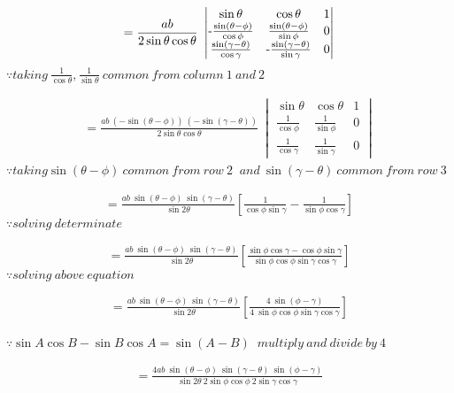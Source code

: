 \documentclass[journal,12pt,twocolumn]{IEEEtran}
\begin{document}
\begin{multline}
=\frac{ab}{2 \sin\theta\cos\theta}~\mydet{
 {\sin\theta} & {\cos\theta} & 1  \\ $-$
 \frac{\sin(\theta-\phi)}{\cos\phi} & \frac{\sin(\theta-\phi)}{\sin\phi} & 0  \\
 \frac{\sin(\gamma-\theta)}{\cos\gamma} &$-$ \frac{\sin(\gamma-\theta)}{\sin\gamma} & 0 
}
\end{multline}
$\because taking ~ \frac{1}{\cos\theta},\frac{1}{\sin\theta}~common ~from ~column~ 1 ~and~ 2$


\begin{multline}
=\frac{ab~(-\sin(\theta-\phi))~(-\sin(\gamma-\theta))}{2 \sin\theta\cos\theta}~\begin{vmatrix}
 {\sin\theta} & {\cos\theta} & 1  \\ 
 \frac{1}{\cos\phi} & \frac{1}{\sin\phi} & 0  \\
 \frac{1}{\cos\gamma} & \frac{1}{\sin\gamma} & 0 
\end{vmatrix}    
\end{multline}
$\because taking \sin(\theta-\phi)~common ~from ~row ~2$
$~and~\sin(\gamma-\theta)~common ~from ~row ~3$


\begin{multline}
=\frac{ab~\sin(\theta-\phi)~\sin(\gamma-\theta)}{ \sin2\theta}\left[\frac{1}{\cos\phi\sin\gamma}-\frac{1}{\sin\phi\cos\gamma}
\right]
\end{multline}
$\because solving~determinate $


\begin{multline}
=\frac{ab~\sin(\theta-\phi)~\sin(\gamma-\theta)}{ \sin2\theta}\left[\frac{\sin\phi\cos\gamma-\cos\phi\sin\gamma}{\sin\phi\cos\phi\sin\gamma\cos\gamma}
\right]
\end{multline}
$\because solving ~above~equation $


\begin{multline}
=\frac{ab~\sin(\theta-\phi)~\sin(\gamma-\theta)}{ \sin2\theta}\left[\frac{4~\sin(\phi-\gamma)}{4~\sin\phi\cos\phi\sin\gamma\cos\gamma}
\right]
\end{multline}

$\because \sin A\cos B - \sin B\cos A=\sin(A-B)$
$~multiply ~and ~divide ~by ~4$


\begin{multline}
=\frac{4ab~\sin(\theta-\phi)~\sin(\gamma-\theta)~\sin(\phi-\gamma)}{ \sin2\theta~2\sin\phi\cos\phi~2\sin\gamma\cos\gamma}
\end{multline}
\end{document}
